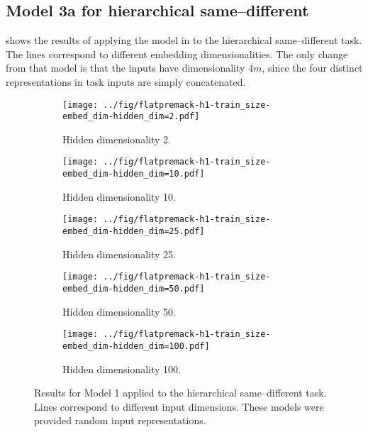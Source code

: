\subsection{Model 3a for hierarchical same--different}\label{app:model1-premack}

 shows the results of applying the model in  to the hierarchical same--different task. The lines correspond to different embedding dimensionalities. The only change from that model is that the inputs have dimensionality $4m$, since the four distinct representations in task inputs are simply concatenated.


\begin{figure}[H]
  \centering

  \begin{subfigure}{0.45\linewidth}
    \texttt{[image: ../fig/flatpremack-h1-train\_size-embed\_dim-hidden\_dim=2.pdf]}
    \caption{Hidden dimensionality 2.}
  \end{subfigure}
  \hfill
  \begin{subfigure}{0.45\linewidth}
    \texttt{[image: ../fig/flatpremack-h1-train\_size-embed\_dim-hidden\_dim=10.pdf]}
    \caption{Hidden dimensionality 10.}
  \end{subfigure}

  \vspace{24pt}

  \begin{subfigure}{0.45\linewidth}
    \texttt{[image: ../fig/flatpremack-h1-train\_size-embed\_dim-hidden\_dim=25.pdf]}
    \caption{Hidden dimensionality 25.}
  \end{subfigure}
  \hfill
  \begin{subfigure}{0.45\linewidth}
    \texttt{[image: ../fig/flatpremack-h1-train\_size-embed\_dim-hidden\_dim=50.pdf]}
    \caption{Hidden dimensionality 50.}
  \end{subfigure}

  \vspace{24pt}

  \begin{subfigure}{0.45\linewidth}
    \texttt{[image: ../fig/flatpremack-h1-train\_size-embed\_dim-hidden\_dim=100.pdf]}
    \caption{Hidden dimensionality 100.}
  \end{subfigure}
  \caption{Results for Model 1 applied to the hierarchical same--different task. Lines correspond to different input dimensions. These models were provided random input representations.}
  \label{fig:model1:premack}
\end{figure}



